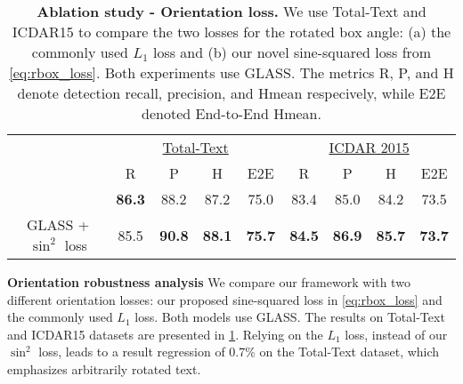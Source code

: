 \documentclass[runningheads]{llncs}
\begin{document}
\begin{table}[t]
\centering
\caption{\textbf{Ablation study - Orientation loss.}
We use Total-Text and ICDAR15 to compare the two losses for the rotated box angle: (a) the commonly used $L_1$ loss and (b) our novel sine-squared loss from \cref{eq:rbox_loss}.
Both experiments use GLASS. The metrics R, P, and H denote detection recall, precision, and Hmean respecively, while E2E denoted End-to-End Hmean.}
\label{tab:ablation3}
\begin{tabular}{ccccccccc}
\toprule
\multicolumn{1}{c}{\multirow{3}{*}{}} & \multicolumn{4}{c}{\underline{Total-Text}}& 
\multicolumn{4}{c}{\underline{ICDAR 2015}} \\
\multicolumn{1}{c}{}                        & R      & P      & H      &   E2E       & R      & P      & H      &         E2E      \\ \hline


GLASS + {$L_1$ loss}      & \textbf{86.3}   &  88.2   &  87.2             &  75.0  & 83.4   &  85.0   &  84.2             &  73.5
\\
GLASS +  {$\sin^2$ loss}      & 85.5  & \textbf{90.8} & \textbf{88.1}              & \textbf{75.7}   & \textbf{84.5}   &  \textbf{86.9}   &  \textbf{85.7}             &  \textbf{73.7} 
\\ \bottomrule
\end{tabular}

\end{table}
 \noindent \textbf{Orientation robustness analysis}
\label{sec:angle_analysis}
We compare our framework with two different orientation losses: our proposed sine-squared loss in \cref{eq:rbox_loss} and the commonly used $L_1$ loss. Both models use GLASS.
The results on Total-Text and ICDAR15 datasets are presented in \cref{tab:ablation3}.
Relying on the $L_1$ loss, instead of our  $\sin^2$  loss, leads to a result regression of 0.7\% on the Total-Text dataset, which emphasizes arbitrarily rotated text.
\end{document}
